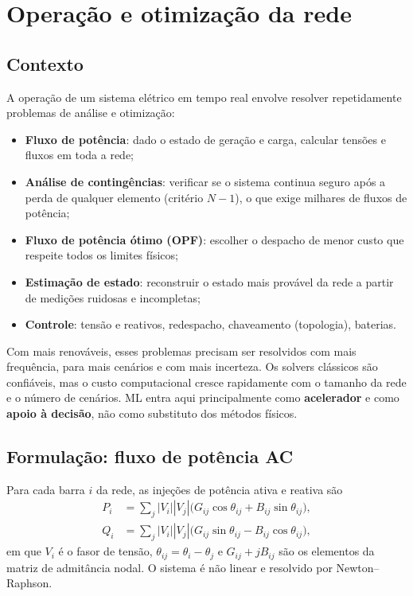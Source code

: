 \documentclass[10pt,a4paper,oneside]{article}
\begin{document}
\section{Operação e otimização da rede}

\subsection{Contexto}

A operação de um sistema elétrico em tempo real envolve resolver
repetidamente problemas de análise e otimização:
\begin{itemize}
  \item \textbf{Fluxo de potência}: dado o estado de geração e carga,
    calcular tensões e fluxos em toda a rede;
  \item \textbf{Análise de contingências}: verificar se o sistema continua
    seguro após a perda de qualquer elemento (critério $N-1$), o que exige
    milhares de fluxos de potência;
  \item \textbf{Fluxo de potência ótimo (OPF)}: escolher o despacho de menor
    custo que respeite todos os limites físicos;
  \item \textbf{Estimação de estado}: reconstruir o estado mais provável da
    rede a partir de medições ruidosas e incompletas;
  \item \textbf{Controle}: tensão e reativos, redespacho, chaveamento
    (topologia), baterias.
\end{itemize}

Com mais renováveis, esses problemas precisam ser resolvidos com mais
frequência, para mais cenários e com mais incerteza. Os solvers clássicos
são confiáveis, mas o custo computacional cresce rapidamente com o
tamanho da rede e o número de cenários. ML entra aqui principalmente como
\textbf{acelerador} e como \textbf{apoio à decisão}, não como substituto dos
métodos físicos.

\subsection{Formulação: fluxo de potência AC}

Para cada barra $i$ da rede, as injeções de potência ativa e reativa são
\begin{align}
  P_i &= \sum_{j} |V_i||V_j| \big(G_{ij}\cos\theta_{ij} + B_{ij}\sin\theta_{ij}\big), \\
  Q_i &= \sum_{j} |V_i||V_j| \big(G_{ij}\sin\theta_{ij} - B_{ij}\cos\theta_{ij}\big),
\end{align}
em que $V_i$ é o fasor de tensão, $\theta_{ij} = \theta_i - \theta_j$ e
$G_{ij} + jB_{ij}$ são os elementos da matriz de admitância nodal. O sistema é
não linear e resolvido por Newton--Raphson.
\end{document}

